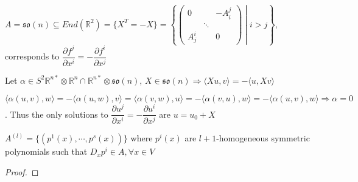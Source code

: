 \documentclass[../main.tex]{subfiles}
\begin{document}
\begin{example}
$A=\mathfrak{so}(n)\subseteq End(\mathbb R^2)=\{X^T=-X\}=\left\{\begin{pmatrix}
0&&-A^j_i\\
&\ddots&\\
A^i_j&&0
\end{pmatrix}\middle|i>j\right\}$, corresponds to $\dfrac{\partial f^j}{\partial x^i}=-\dfrac{\partial f^i}{\partial x^j}$ \par
Let $\alpha\in S^2\mathbb R^{n*}\otimes\mathbb R^n\cap\mathbb R^{n*}\otimes\mathfrak{so}(n)$, $X\in\mathfrak{so}(n)\Rightarrow\langle Xu,v\rangle=-\langle u,Xv\rangle$ \par
$\langle \alpha(u,v),w\rangle=-\langle \alpha(u,w),v\rangle=\langle \alpha(v,w),u\rangle=-\langle \alpha(v,u),w\rangle=-\langle\alpha(u,v),w\rangle\Rightarrow\alpha=0$. Thus the only solutions to $\dfrac{\partial u^j}{\partial x^i}=-\dfrac{\partial u^i}{\partial x^j}$ are $u=u_0+X$
\end{example}

\begin{proposition}
$A^{(l)}=\{(p^1(x),\cdots,p^s(x))\}$ where $p^i(x)$ are $l+1$-homogeneous symmetric polynomials such that $D_xp^i\in A,\forall x\in V$
\end{proposition}

\begin{proof}

\end{proof}
\end{document}
